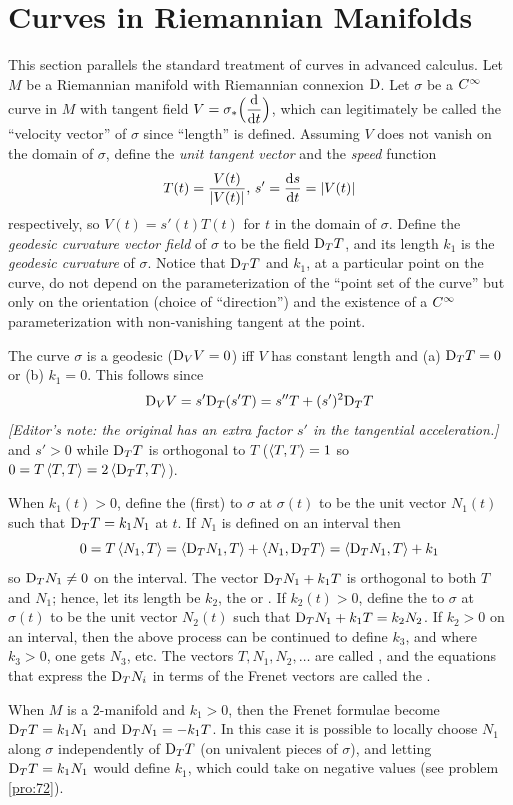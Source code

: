 \documentclass[../main]{subfiles}
\begin{document}
\section{Curves in Riemannian Manifolds}\label{ch06:s3}

This section parallels the standard treatment of curves in advanced calculus. Let $M$ be a Riemannian manifold with Riemannian connexion $\mathrm{D}$. Let $\sigma$ be a $C^\infty$ curve in $M$ with tangent field $V=\sigma_*\Big(\dv{}{t}\Big)$, which can legitimately be called the ``velocity vector'' of $\sigma$ since ``length'' is defined. Assuming $V$ does not vanish on the domain of $\sigma$, define the \emph{unit tangent vector} and  the \emph{speed} function
\[T(t)=\frac{V(t)}{\left|V(t)\right|}, \, s'=\dfrac{\mathrm{d}s}{\mathrm{d}t} = \left|V(t)\right|\]
respectively, so $V(t)=s'(t)T(t)$ for $t$ in the domain of $\sigma$. Define the \emph{geodesic curvature vector field} of $\sigma$ to be the field $\mathrm{D}_TT$, and its length $k_1$ is the \emph{geodesic curvature} of $\sigma$. Notice that $\mathrm{D}_TT$ and $k_1$, at a particular point on the curve, do not depend on the parameterization of the ``point set of the curve'' but only on the orientation (choice of ``direction'') and the existence of a $C^\infty$ parameterization with non-vanishing tangent at the point.

The curve $\sigma$ is a geodesic ($\mathrm{D}_VV=0$) iff $V$ has constant length and (a) $\mathrm{D}_TT=0$ or (b) $k_1=0$. This follows since
\[\mathrm{D}_VV = s'\mathrm{D}_T(s'T) = s''T+(s')^2\mathrm{D}_TT\]
\emph{[Editor's note: the original has an extra factor $s'$ in the tangential acceleration.]}
and $s'>0$ while $\mathrm{D}_TT$ is orthogonal to $T$ ($\left\langle T,T\right\rangle=1$ so \newline $0=T\left\langle T,T\right\rangle=2\left\langle\mathrm{D}_TT,T\right\rangle$).

When $k_1(t)>0$, define the (first)  to $\sigma$ at $\sigma(t)$ to be the unit vector $N_1(t)$ such that $\mathrm{D}_TT=k_1N_1$ at $t$. If $N_1$ is defined on an interval then
\[0 = T\left\langle N_1,T\right\rangle = \left\langle\mathrm{D}_TN_1,T\right\rangle+\left\langle N_1,\mathrm{D}_TT\right\rangle = \left\langle\mathrm{D}_TN_1,T\right\rangle+k_1\]
so $\mathrm{D}_TN_1\ne0$ on the interval. The vector $\mathrm{D}_TN_1+k_1T$ is orthogonal to both $T$ and $N_1$; hence, let its length be $k_2$, the  or . If $k_2(t)>0$, define the  to $\sigma$ at $\sigma(t)$ to be the unit vector $N_2(t)$ such that $\mathrm{D}_TN_1+k_1T=k_2N_2$. If $k_2>0$ on an interval, then the above process can be continued to define $k_3$, and where $k_3>0$, one gets $N_3$, etc. The vectors $T,N_1,N_2,\ldots$ are called , and the equations that express the $\mathrm{D}_TN_i$ in terms of the Frenet vectors are called the .

When $M$ is a 2-manifold and $k_1>0$, then the Frenet formulae become \newline $\mathrm{D}_TT=k_1N_1$ and $\mathrm{D}_TN_1=-k_1T$. In this case it is possible to locally choose $N_1$ along $\sigma$ independently of $\mathrm{D}_TT$ (on univalent pieces of $\sigma$), and letting $\mathrm{D}_TT=k_1N_1$ would define $k_1$, which could take on negative values (see problem \ref{pro:72}).
\end{document}
